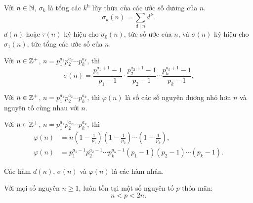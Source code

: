 \documentclass[../../imo-training-open-book.tex]{subfiles}
\begin{document}
\begin{definition*}
    \label{definition:sigma-function}
    Với $n \in \mathbb N$, $\sigma_k$ là tổng các $k^{\text{h}}$ lũy thừa của các ước số dương của $n$.  
    \[
        \sigma_k(n) = \sum_{d \mid n} d^k.
    \]
    $d(n)$ hoặc $\tau(n)$ ký hiệu cho $\sigma_0(n)$, tức số ước của $n$, và $\sigma(n)$ ký hiệu cho $\sigma_1(n)$, tức tổng các ước số của $n$.
\end{definition*}

\begin{theorem*}
    \label{theorem:sigma-function}
    Với $n \in \mathbb Z^{+}$, $n=p_1^{a_1}p_2^{a_2} \cdots p_k^{a_k}$, thì
    \[
        \sigma(n) = \frac{p_1^{a_1+1}-1}{p_1-1} \cdot \frac{p_2^{a_2+1}-1}{p_2-1} \cdots \frac{p_k^{a_k+1}-1}{p_k-1}.
    \]
\end{theorem*}

\begin{definition*}
    \label{definition:euler-totient-function}
    Với $n \in \mathbb Z^{+}$, $n=p_1^{a_1}p_2^{a_2} \cdots p_k^{a_k}$, thì
    $\varphi(n)$ là số các số nguyên dương nhỏ hơn $n$ và nguyên tố cùng nhau với $n$.
\end{definition*}

\begin{theorem*}
    \label{theorem:euler-totient-function}
    Với $n \in \mathbb Z^{+}$, $n=p_1^{a_1}p_2^{a_2} \cdots p_k^{a_k}$, thì
    \[
        \begin{aligned}
            \varphi(n) &= n\left(1-\frac{1}{p_1} \right) \left(1-\frac{1}{p_2} \right) \cdots \left(1-\frac{1}{p_k} \right),\\[1ex]
            \varphi(n) &= p_1^{a_1-1}p_2^{a_2-1} \cdots p_k^{a_k-1}(p_1-1)(p_2-1)\cdots (p_k-1).
        \end{aligned}
    \]
\end{theorem*}

\begin{lemma*}
    \label{lemma:basic-additive-functions}
    Các hàm $d(n)$, $\sigma(n)$ và $\varphi(n)$ là các hàm nhân.
\end{lemma*}

\begin{theorem}[Bổ đề Bertrand]
    \label{theorem:bertrand}
    Với mọi số nguyên \( n \geq 1 \), luôn tồn tại một số nguyên tố \( p \) thỏa mãn:
    \[
        n < p < 2n.
    \]
\end{theorem}
\end{document}
